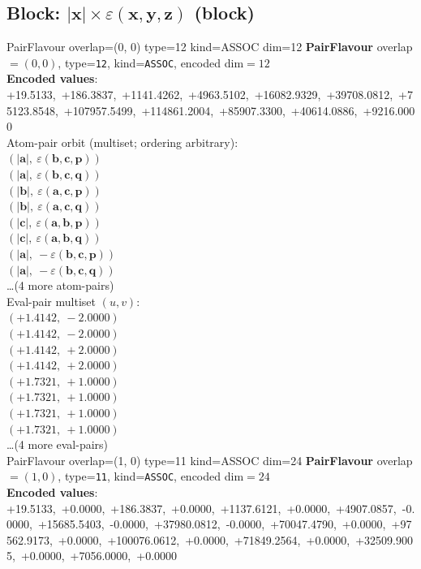 \documentclass[a4paper,11pt]{article}
\newcommand{\vc}[1]{\ensuremath{\mathbf{#1}}}
\newcommand{\dnfagmiihhiejm}[1]{|\vc{#1}|}
\newcommand{\kblbmcpggoncpf}[3]{\varepsilon(\mathbf{#1},\mathbf{#2},\mathbf{#3})}
\begin{document}
\subsection{Block: $\dnfagmiihhiejm{x} \times \kblbmcpggoncpf{x}{y}{z}$  (block)}
    PairFlavour  overlap=(0, 0)  type=12  kind=ASSOC  dim=12
\textbf{PairFlavour} overlap$=(0, 0)$, type=\texttt{12}, kind=\texttt{ASSOC}, encoded dim$=12$\\
\textbf{      Encoded values}: +19.5133,\ +186.3837,\ +1141.4262,\ +4963.5102,\ +16082.9329,\ +39708.0812,\ +75123.8548,\ +107957.5499,\ +114861.2004,\ +85907.3300,\ +40614.0886,\ +9216.0000\\
\quad Atom-pair orbit (multiset; ordering arbitrary):\\
$(\dnfagmiihhiejm{a},\ \kblbmcpggoncpf{b}{c}{p})$\\
$(\dnfagmiihhiejm{a},\ \kblbmcpggoncpf{b}{c}{q})$\\
$(\dnfagmiihhiejm{b},\ \kblbmcpggoncpf{a}{c}{p})$\\
$(\dnfagmiihhiejm{b},\ \kblbmcpggoncpf{a}{c}{q})$\\
$(\dnfagmiihhiejm{c},\ \kblbmcpggoncpf{a}{b}{p})$\\
$(\dnfagmiihhiejm{c},\ \kblbmcpggoncpf{a}{b}{q})$\\
$(\dnfagmiihhiejm{a},\ -\kblbmcpggoncpf{b}{c}{p})$\\
$(\dnfagmiihhiejm{a},\ -\kblbmcpggoncpf{b}{c}{q})$\\
\quad \ldots (4 more atom-pairs)\\
\quad Eval-pair multiset $(u, v)$:\\
$(+1.4142,\ -2.0000)$\\
$(+1.4142,\ -2.0000)$\\
$(+1.4142,\ +2.0000)$\\
$(+1.4142,\ +2.0000)$\\
$(+1.7321,\ +1.0000)$\\
$(+1.7321,\ +1.0000)$\\
$(+1.7321,\ +1.0000)$\\
$(+1.7321,\ +1.0000)$\\
\quad \ldots (4 more eval-pairs)\\
    PairFlavour  overlap=(1, 0)  type=11  kind=ASSOC  dim=24
\textbf{PairFlavour} overlap$=(1, 0)$, type=\texttt{11}, kind=\texttt{ASSOC}, encoded dim$=24$\\
\textbf{      Encoded values}: +19.5133,\ +0.0000,\ +186.3837,\ +0.0000,\ +1137.6121,\ +0.0000,\ +4907.0857,\ -0.0000,\ +15685.5403,\ -0.0000,\ +37980.0812,\ -0.0000,\ +70047.4790,\ +0.0000,\ +97562.9173,\ +0.0000,\ +100076.0612,\ +0.0000,\ +71849.2564,\ +0.0000,\ +32509.9005,\ +0.0000,\ +7056.0000,\ +0.0000\\
\end{document}
